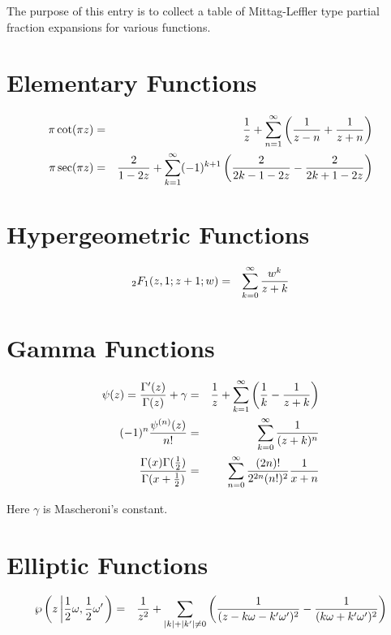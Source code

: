 \documentclass[12pt]{article}
\begin{document}
The purpose of this entry is to collect a table of Mittag-Leffler type
partial fraction expansions for various functions.

\section{Elementary Functions}

\begin{eqnarray}
\pi \cot (\pi z) &=& {1 \over z} + \sum_{n=1}^\infty \left( {1 \over z -
n} + {1 \over z + n} \right) \\
\pi \sec (\pi z) &=& {2 \over 1 - 2z} + \sum_{k=1}^\infty (-1)^{k+1}
\left( {2 \over 2k - 1 - 2z} - {2 \over 2k + 1 - 2z}   \right) \\
\end{eqnarray}

\section{Hypergeometric Functions}
\begin{eqnarray}
{}_2F_1 (z,1;z+1;w) &=& \sum_{k=0}^\infty {w^k \over z+k} \\
\end{eqnarray}

\section{Gamma Functions}

\begin{eqnarray}
\psi (z) = {\Gamma'(z) \over \Gamma(z)} + \gamma &=& {1 \over z} +
\sum_{k=1}^\infty \left( {1 \over k} - {1 \over z + k} \right) \\
(-1)^n {\psi^{(n)} (z) \over n!} &=& \sum_{k=0}^\infty {1 \over (z + k)^n} \\
{\Gamma (x) \Gamma(\frac{1}{2}) \over \Gamma (x + \frac{1}{2})} &=&
\sum_{n=0}^\infty {(2n)! \over 2^{2n} (n!)^2} {1 \over x + n} \\
\end{eqnarray}

Here $\gamma$ is Mascheroni's constant.

\section{Elliptic Functions}

\begin{eqnarray}
\wp \left(z \left| \frac{1}{2} \omega, \frac{1}{2} \omega' \right.\right) &=&
{1 \over z^2} + \sum_{|k| + |k'| \neq 0} \left( 
{1 \over (z - k \omega - k' \omega')^2} -
{1 \over (k \omega + k' \omega')^2} \right) \\
\end{eqnarray}
\end{document}
